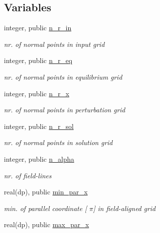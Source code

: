 \subsection*{Variables}
\begin{DoxyCompactItemize}
\item 
integer, public \hyperlink{namespacegrid__vars_ad1047cc6f07720d61c8e6fdc3c68a317}{n\+\_\+r\+\_\+in}
\begin{DoxyCompactList}\small\item\em nr. of normal points in input grid \end{DoxyCompactList}\item 
integer, public \hyperlink{namespacegrid__vars_aa3785d71892d3d7db81aca0b6aa880b0}{n\+\_\+r\+\_\+eq}
\begin{DoxyCompactList}\small\item\em nr. of normal points in equilibrium grid \end{DoxyCompactList}\item 
integer, public \hyperlink{namespacegrid__vars_abee8a41de92fe25b2d3dfaf472b02cd2}{n\+\_\+r\+\_\+x}
\begin{DoxyCompactList}\small\item\em nr. of normal points in perturbation grid \end{DoxyCompactList}\item 
integer, public \hyperlink{namespacegrid__vars_ad998db12a656afb94d2d54a7d0eca642}{n\+\_\+r\+\_\+sol}
\begin{DoxyCompactList}\small\item\em nr. of normal points in solution grid \end{DoxyCompactList}\item 
integer, public \hyperlink{namespacegrid__vars_a83a6486b23c4a218822540da15904426}{n\+\_\+alpha}
\begin{DoxyCompactList}\small\item\em nr. of field-\/lines \end{DoxyCompactList}\item 
real(dp), public \hyperlink{namespacegrid__vars_a689c08cf03bc54338878f85c6429b856}{min\+\_\+par\+\_\+x}
\begin{DoxyCompactList}\small\item\em min. of parallel coordinate \mbox{[} $\pi$\mbox{]} in field-\/aligned grid \end{DoxyCompactList}\item 
real(dp), public \hyperlink{namespacegrid__vars_acaa1fd21d0c728ad8f24591c0d2a5801}{max\+\_\+par\+\_\+x}

\end{DoxyCompactItemize}
